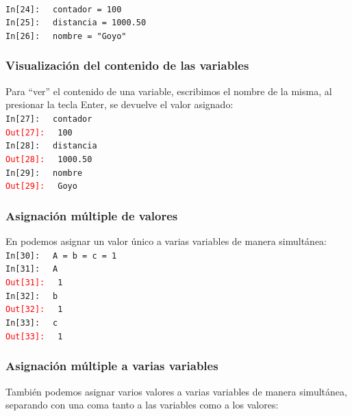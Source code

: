 {\begin{frame}[fragile]
\\
\bigskip
\pause
\textcolor{ao}{\texttt{In[24]: }} \verb| contador = 100| \\ \pause
\textcolor{ao}{\texttt{In[25]: }} \verb| distancia = 1000.50| \\ \pause
\textcolor{ao}{\texttt{In[26]: }} \verb| nombre = "Goyo"|
\end{frame}
\begin{frame}[fragile]
\frametitle{Visualización del contenido de las variables}
Para \enquote{ver} el contenido de una variable, escribimos el nombre de la misma, al presionar la tecla Enter, se devuelve el valor asignado:
\\
\bigskip
\pause
\textcolor{ao}{\texttt{In[27]: }} \verb| contador| \\
\pause
\textcolor{red}{\texttt{Out[27]: }} \verb| 100| \\
\pause
\textcolor{ao}{\texttt{In[28]: }} \verb| distancia| \\
\pause
\textcolor{red}{\texttt{Out[28]: }} \verb| 1000.50| \\
\pause
\textcolor{ao}{\texttt{In[29]: }} \verb| nombre| \\
\pause
\textcolor{red}{\texttt{Out[29]: }} \verb| Goyo|
\end{frame}
\begin{frame}[fragile]
\frametitle{Asignación múltiple de valores}
En \python{} podemos asignar un valor único a varias variables de manera simultánea:
\\
\bigskip
\pause
\textcolor{ao}{\texttt{In[30]: }} \verb| A = b = c = 1 | \\
\pause
\textcolor{ao}{\texttt{In[31]: }} \verb| A | \\
\pause
\textcolor{red}{\texttt{Out[31]: }} \verb| 1 | \\
\pause
\textcolor{ao}{\texttt{In[32]: }} \verb| b | \\
\pause
\textcolor{red}{\texttt{Out[32]: }} \verb| 1 | \\
\pause
\textcolor{ao}{\texttt{In[33]: }} \verb| c | \\
\pause
\textcolor{red}{\texttt{Out[33]: }} \verb| 1 |
\end{frame}
\begin{frame}[fragile]
\frametitle{Asignación múltiple a varias variables}
También podemos asignar varios valores a varias variables de manera simultánea, separando con una coma tanto a las variables como a los valores:
\end{frame}
\begin{frame}[fragile]

\end{frame}}
